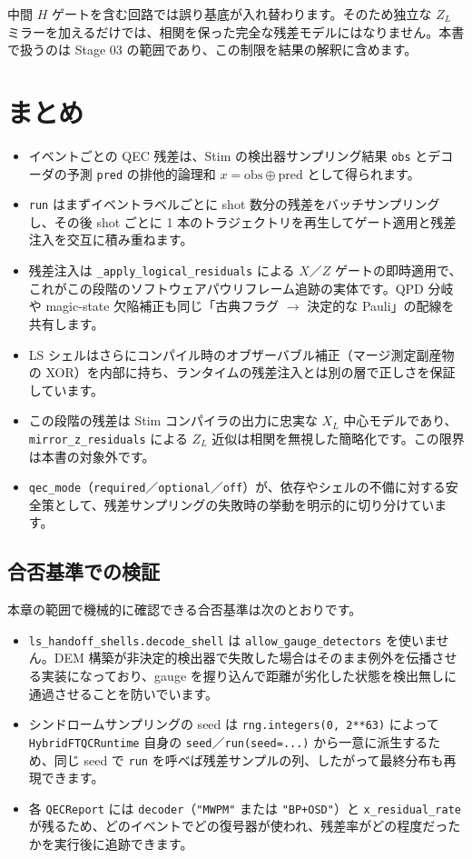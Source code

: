 中間 $H$ ゲートを含む回路では誤り基底が入れ替わります。そのため独立な $Z_L$ ミラーを加えるだけでは、相関を保った完全な残差モデルにはなりません。本書で扱うのは Stage 03 の範囲であり、この制限を結果の解釈に含めます。

\section{まとめ}\label{ch22:summary}

\begin{itemize}
  \item イベントごとの QEC 残差は、Stim の検出器サンプリング結果 \texttt{obs} とデコーダの予測 \texttt{pred} の排他的論理和 $x=\mathrm{obs}\oplus\mathrm{pred}$ として得られます。
  \item \texttt{run} はまずイベントラベルごとに shot 数分の残差をバッチサンプリングし、その後 shot ごとに 1 本のトラジェクトリを再生してゲート適用と残差注入を交互に積み重ねます。
  \item 残差注入は \texttt{\_apply\_logical\_residuals} による $X$／$Z$ ゲートの即時適用で、これがこの段階のソフトウェアパウリフレーム追跡の実体です。QPD 分岐や magic-state 欠陥補正も同じ「古典フラグ $\to$ 決定的な Pauli」の配線を共有します。
  \item LS シェルはさらにコンパイル時のオブザーバブル補正（マージ測定副産物の XOR）を内部に持ち、ランタイムの残差注入とは別の層で正しさを保証しています。
  \item この段階の残差は Stim コンパイラの出力に忠実な $X_L$ 中心モデルであり、\texttt{mirror\_z\_residuals} による $Z_L$ 近似は相関を無視した簡略化です。この限界は本書の対象外です。
  \item \texttt{qec\_mode}（\texttt{required}／\texttt{optional}／\texttt{off}）が、依存やシェルの不備に対する安全策として、残差サンプリングの失敗時の挙動を明示的に切り分けています。
\end{itemize}

\subsection*{合否基準での検証}

本章の範囲で機械的に確認できる合否基準は次のとおりです。

\begin{itemize}
  \item \texttt{ls\_handoff\_shells.decode\_shell} は \texttt{allow\_gauge\_detectors} を使いません。DEM 構築が非決定的検出器で失敗した場合はそのまま例外を伝播させる実装になっており、gauge を握り込んで距離が劣化した状態を検出無しに通過させることを防いでいます。
  \item シンドロームサンプリングの seed は \texttt{rng.integers(0, 2**63)} によって \texttt{HybridFTQCRuntime} 自身の \texttt{seed}／\texttt{run(seed=...)} から一意に派生するため、同じ seed で \texttt{run} を呼べば残差サンプルの列、したがって最終分布も再現できます。
  \item 各 \texttt{QECReport} には \texttt{decoder}（\texttt{"MWPM"} または \texttt{"BP+OSD"}）と \texttt{x\_residual\_rate} が残るため、どのイベントでどの復号器が使われ、残差率がどの程度だったかを実行後に追跡できます。
\end{itemize}


